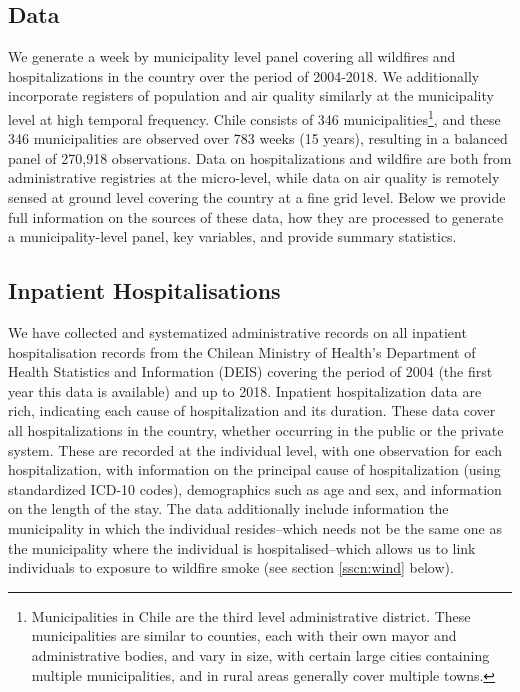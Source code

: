 \documentclass[11pt]{article}
\begin{document}
\begin{spacing}{1.3}
\section{Data}
\label{scn:data} 
We generate a week by municipality level panel covering all wildfires and hospitalizations in the country over the period of 2004-2018.  We additionally incorporate registers of population and air quality similarly at the municipality level at high temporal frequency.  Chile consists of 346 municipalities\footnote{Municipalities in Chile are the third level administrative district.  These municipalities are similar to counties, each with their own mayor and administrative bodies, and vary in size, with certain large cities containing multiple municipalities, and in rural areas generally cover multiple towns.}, and these 346 municipalities are observed over 783 weeks (15 years), resulting in a balanced panel of 270,918 observations.
Data on hospitalizations and wildfire are both from administrative registries at the micro-level, while data on air quality is remotely sensed at ground level covering the country at a fine grid level.  Below we provide full information on the sources of these data, how they are processed to generate a municipality-level panel, key variables, and provide summary statistics. 

\subsection{Inpatient Hospitalisations}
\label{sscn:hospitalisations} 
We have collected and systematized administrative records on all inpatient hospitalisation records from the Chilean Ministry of Health's Department of Health Statistics and Information (DEIS) covering the period of 2004 (the first year this data is available) and up to 2018. Inpatient hospitalization data are rich, indicating each cause of hospitalization and its duration.  These data cover all hospitalizations in the country, whether occurring in the public or the private system. These are recorded at the individual level, with one observation for each hospitalization, with information on the principal cause of hospitalization (using standardized ICD-10 codes), demographics such as age and sex, and information on the length of the stay.  The data additionally include information the municipality in which the individual resides--which needs not be the same one as the municipality where the individual is hospitalised--which allows us to link individuals to exposure to wildfire smoke (see section \ref{sscn:wind} below). 


\end{spacing}
\end{document}
